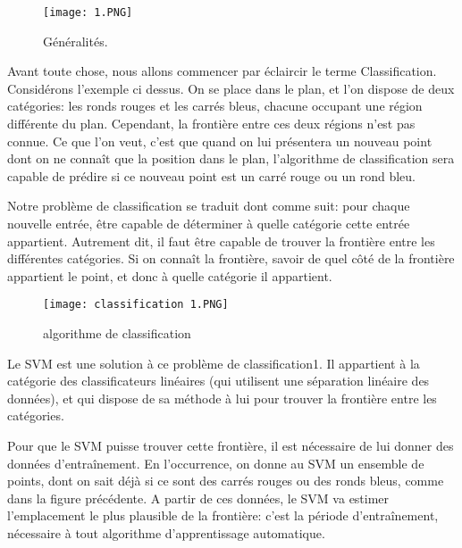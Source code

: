 \documentclass{article}
\begin{document}
\begin{figure}[b!]
  \texttt{[image: 1.PNG]}
  \caption{Généralités.}
  \label{fig1:SVM}
\end{figure}
\vspace{5mm} %
Avant toute chose, nous allons commencer par éclaircir le terme Classification.
Considérons l’exemple ci dessus. On se place dans le plan, et l’on dispose de deux catégories: les ronds rouges et les carrés bleus, chacune occupant une région différente du plan.
Cependant, la frontière entre ces deux régions n’est pas connue. 
Ce que l’on veut, c’est que quand on lui présentera un nouveau point dont on ne connaît que la position dans le plan, l’algorithme de classification sera capable de prédire si ce nouveau point est un carré rouge ou un rond bleu.

Notre problème de classification se traduit dont comme suit: pour chaque nouvelle entrée, être capable de déterminer à quelle catégorie cette entrée appartient.
Autrement dit, il faut être capable de trouver la frontière entre les différentes catégories.
Si on connaît la frontière, savoir de quel côté de la frontière appartient le point, et donc à quelle catégorie il appartient.

\vspace{5mm} %
\begin{figure}[b!]
  \texttt{[image: classification 1.PNG]}
  \caption{algorithme de classification}
  \label{fig2:algorithme de classification}
\end{figure}
\vspace{5mm} %
Le SVM est une solution à ce problème de classification1.
Il appartient à la catégorie des classificateurs linéaires (qui utilisent une séparation linéaire des données), et qui dispose de sa méthode à lui pour trouver la frontière entre les catégories.

Pour que le SVM puisse trouver cette frontière, il est nécessaire de lui donner des données d’entraînement. En l’occurrence, on donne au SVM un ensemble de points, dont on sait déjà si ce sont des carrés rouges ou des ronds bleus, comme dans la figure précédente. A partir de ces données, le SVM va estimer l’emplacement le plus plausible de la frontière: c’est la période d'entraînement, nécessaire à tout algorithme d’apprentissage automatique.
\end{document}
